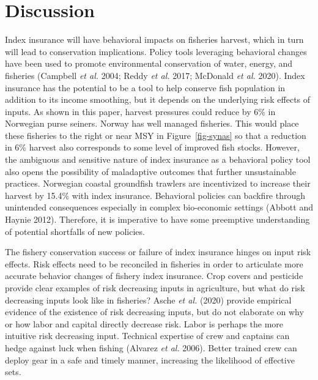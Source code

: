 \documentclass[
  letterpaper,
  DIV=11,
  numbers=noendperiod]{scrartcl}
\theoremstyle{plain}
\theoremstyle{plain}
\theoremstyle{remark}
\begin{document}
\hypertarget{sec-disc}{%
\section{Discussion}\label{sec-disc}}

Index insurance will have behavioral impacts on fisheries harvest, which
in turn will lead to conservation implications. Policy tools leveraging
behavioral changes have been used to promote environmental conservation
of water, energy, and fisheries (Campbell \emph{et al.} 2004; Reddy
\emph{et al.} 2017; McDonald \emph{et al.} 2020). Index insurance has
the potential to be a tool to help conserve fish population in addition
to its income smoothing, but it depends on the underlying risk effects
of inputs. As shown in this paper, harvest pressures could reduce by 6\%
in Norwegian purse seiners. Norway has well managed fisheries. This
would place these fisheries to the right or near MSY in
Figure~\ref{fig-synas} so that a reduction in 6\% harvest also
corresponds to some level of improved fish stocks. However, the
ambiguous and sensitive nature of index insurance as a behavioral policy
tool also opens the possibility of maladaptive outcomes that further
unsustainable practices. Norwegian coastal groundfish trawlers are
incentivized to increase their harvest by 15.4\% with index insurance.
Behavioral policies can backfire through unintended consequences
especially in complex bio-economic settings (Abbott and Haynie 2012).
Therefore, it is imperative to have some preemptive understanding of
potential shortfalls of new policies.

The fishery conservation success or failure of index insurance hinges on
input risk effects. Risk effects need to be reconciled in fisheries in
order to articulate more accurate behavior changes of fishery index
insurance. Crop covers and pesticide provide clear examples of risk
decreasing inputs in agriculture, but what do risk decreasing inputs
look like in fisheries? Asche \emph{et al.} (2020) provide empirical
evidence of the existence of risk decreasing inputs, but do not
elaborate on why or how labor and capital directly decrease risk. Labor
is perhaps the more intuitive risk decreasing input. Technical expertise
of crew and captains can hedge against luck when fishing (Alvarez
\emph{et al.} 2006). Better trained crew can deploy gear in a safe and
timely manner, increasing the likelihood of effective sets.
\end{document}
